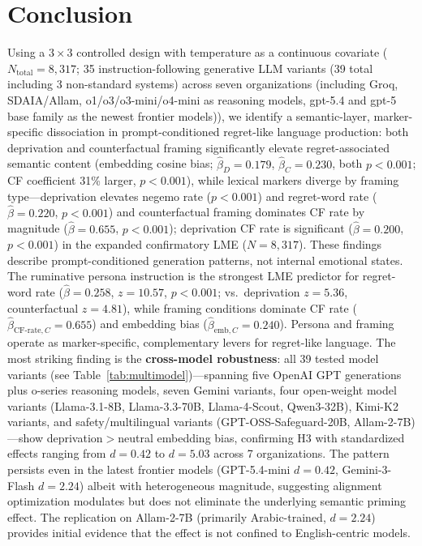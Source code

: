 \documentclass[conference,10pt]{IEEEtran}
\begin{document}
\section{Conclusion}
Using a $3\times3$ controlled design with temperature as a continuous covariate ($N_\text{total}=8{,}317$; 35 instruction-following generative LLM variants (39 total including 3 non-standard systems) across seven organizations (including Groq, SDAIA/Allam, o1/o3/o3-mini/o4-mini as reasoning models, gpt-5.4 and gpt-5 base family as the newest frontier models)), we identify a semantic-layer, marker-specific dissociation in prompt-conditioned regret-like language production: both deprivation and counterfactual framing significantly elevate regret-associated semantic content (embedding cosine bias; $\hat{\beta}_D=0.179$, $\hat{\beta}_C=0.230$, both $p<0.001$; CF coefficient 31\% larger, $p<0.001$), while lexical markers diverge by framing type---deprivation elevates negemo rate ($p<0.001$) and regret-word rate ($\hat{\beta}=0.220$, $p<0.001$) and counterfactual framing dominates CF rate by magnitude ($\hat{\beta}=0.655$, $p<0.001$); deprivation CF rate is significant ($\hat{\beta}=0.200$, $p<0.001$) in the expanded confirmatory LME ($N=8{,}317$). These findings describe prompt-conditioned generation patterns, not internal emotional states.
The ruminative persona instruction is the strongest LME predictor for regret-word rate ($\hat{\beta}=0.258$, $z=10.57$, $p<0.001$; vs.\ deprivation $z=5.36$, counterfactual $z=4.81$), while framing conditions dominate CF rate ($\hat{\beta}_{\text{CF-rate},C}=0.655$) and embedding bias ($\hat{\beta}_{\text{emb},C}=0.240$). Persona and framing operate as marker-specific, complementary levers for regret-like language.
The most striking finding is the \textbf{cross-model robustness}: all 39 tested model variants (see Table~\ref{tab:multimodel})---spanning five OpenAI GPT generations plus o-series reasoning models, seven Gemini variants, four open-weight model variants (Llama-3.1-8B, Llama-3.3-70B, Llama-4-Scout, Qwen3-32B), Kimi-K2 variants, and safety/multilingual variants (GPT-OSS-Safeguard-20B, Allam-2-7B)---show deprivation$>$neutral embedding bias, confirming H3 with standardized effects ranging from $d=0.42$ to $d=5.03$ across 7 organizations. The pattern persists even in the latest frontier models (GPT-5.4-mini $d=0.42$, Gemini-3-Flash $d=2.24$) albeit with heterogeneous magnitude, suggesting alignment optimization modulates but does not eliminate the underlying semantic priming effect. The replication on Allam-2-7B (primarily Arabic-trained, $d=2.24$) provides initial evidence that the effect is not confined to English-centric models.
\end{document}

